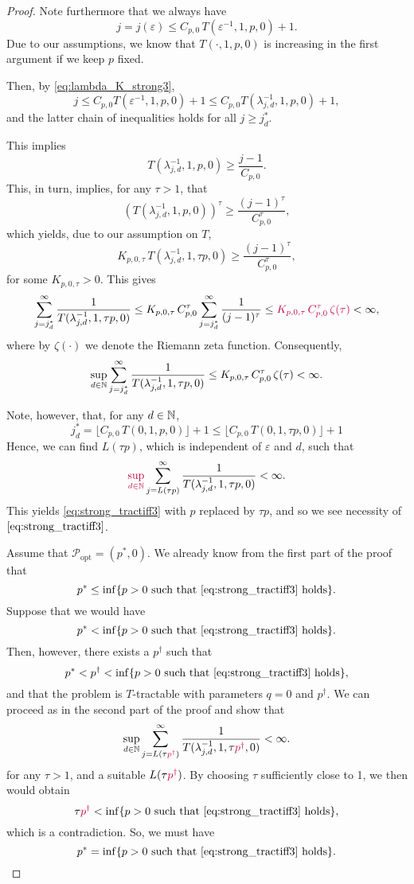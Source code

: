 \documentclass[11pt,a4paper]{article}
\newcommand{\peter}[1]{\begingroup\color{purple}#1\endgroup}
\begin{document}
{\begin{proof}
Note furthermore that we always have
\[
j=j(\varepsilon)\le C_{p,0}\, T(\varepsilon^{-1},1,p,0)+1.
\]
Due to our assumptions, we know that 
$T(\cdot,1, p,0)$ is increasing in the first argument if 
we keep $p$ fixed. 

Then, by \eqref{eq:lambda_K_strong3},
\[
j \le C_{p,0} T(\varepsilon^{-1},1,p,0)+1\le C_{p,0} T(\lambda_{j,d}^{-1},1,p,0)+1,
\]
and the latter chain of inequalities holds for all $j\ge j_d^*$. 


This implies
\[ 
 T(\lambda_{j,d}^{-1},1, p,0) \ge \frac{j-1}{C_{p,0}}.
\]
This, in turn, implies, for any $\tau>1$, that 
\[ 
 (T(\lambda_{j,d}^{-1},1, p,0))^\tau \ge \frac{(j-1)^\tau}{C_{p,0}^\tau },
\]
which yields, due to our assumption on $T$, 
\[ 
 K_{p,0,\tau}\,T (\lambda_{j,d}^{-1},1,\tau p,0) \ge \frac{(j-1)^\tau}{C_{p,0}^\tau},
\]
for some $K_{p,0,\tau}>0$.
This gives
\[
\sum_{j=j_d^*}^\infty \frac{1}{T (\lambda_{j,d}^{-1},1, \tau p,0)} \le K_{p,0,\tau}\, C_{p,0}^\tau
\sum_{j=j_d^*}^\infty \frac{1}{(j-1)^\tau} \le
\peter{K_{p,0,\tau}\, C_{p,0}^\tau\, \zeta (\tau) }< \infty,
\]
\peter{where by $\zeta(\cdot)$ we denote the Riemann zeta function. Consequently, 
\[
\sup_{d\in\mathbb{N}} \sum_{j=j_d^*}^\infty \frac{1}{T (\lambda_{j,d}^{-1},1, \tau p,0)} \le K_{p,0,\tau}\, C_{p,0}^\tau\, \zeta (\tau) < \infty.
\]
}


Note, however, that, \peter{for any $d\in\mathbb{N}$,}
\[
 j_d^* = \lfloor C_{p,0}\, T(0,1,p,0)\rfloor +1 \le \lfloor C_{p,0}\, T(0,1,\tau p,0)\rfloor +1
\]
Hence, we can find $L(\tau p)$, which is independent of $\varepsilon$ and $d$, such that 
\[
 \peter{\sup_{d\in\naturals}} \sum_{j=L(\tau p)}^\infty \frac{1}{T(\lambda_{j,d}^{-1},1, \tau p,0)}<\infty.
\]
This yields \eqref{eq:strong_tractiff3} with $p$ replaced by $\tau p$, and so we see necessity of $\eqref{eq:strong_tractiff3}$. 


Assume that $\mathcal{P}_{\text{opt}}=(p^*,0)$. We already know from the first part of the proof that 
\[
 p^* \le \inf\{p>0\ \mbox{such that \eqref{eq:strong_tractiff3} holds}\}.
\]
Suppose that we would have 
\[
 p^* < \inf\{p>0\ \mbox{such that \eqref{eq:strong_tractiff3} holds}\}.
\]
\peter{Then, however, there exists a $p^\dag$ such that
\[
p^* < p^\dag < \inf\{p>0\ \mbox{such that \eqref{eq:strong_tractiff3} holds}\},
\]
and that the problem is $T$-tractable with parameters $q=0$ and $p^\dag$. }
We can proceed as in the second part of the proof and show that 
\[
 \sup_{d\in\naturals} \sum_{j=L(\tau \peter{p^\dag})}^\infty \frac{1}{T(\lambda_{j,d}^{-1},1, \tau \peter{p^\dag},0)}<\infty.
\]
for any $\tau>1$, and a suitable $L(\tau \peter{p^\dag})$. By choosing $\tau$ sufficiently close to 1, we then would 
obtain 
\[
 \tau \peter{p^\dag} < \inf\{p>0\ \mbox{such that \eqref{eq:strong_tractiff3} holds}\},
\]
which is a contradiction. So, we must have 
\[
 p^* = \inf\{p>0\ \mbox{such that \eqref{eq:strong_tractiff3} holds}\}.
\]


\end{proof}}
\end{document}
